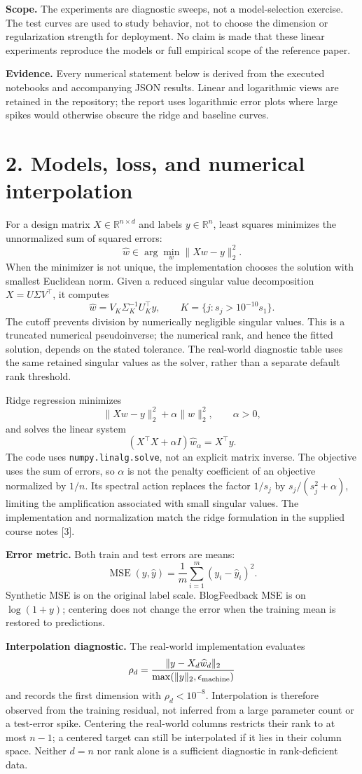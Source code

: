 \documentclass[10pt,a4paper]{article}
\newcommand{\pageheading}[1]{\section*{#1}}
\begin{document}
\textbf{Scope.} The experiments are diagnostic sweeps, not a model-selection exercise. The test curves are used to study behavior, not to choose the dimension or regularization strength for deployment. No claim is made that these linear experiments reproduce the models or full empirical scope of the reference paper.

\textbf{Evidence.} Every numerical statement below is derived from the executed notebooks and accompanying JSON results. Linear and logarithmic views are retained in the repository; the report uses logarithmic error plots where large spikes would otherwise obscure the ridge and baseline curves.

\newpage
\pageheading{2. Models, loss, and numerical interpolation}
For a design matrix $X\in\mathbb{R}^{n\times d}$ and labels $y\in\mathbb{R}^n$, least squares minimizes the unnormalized sum of squared errors:
\[
\widehat w\in\arg\min_w\|Xw-y\|_2^2.
\]
When the minimizer is not unique, the implementation chooses the solution with smallest Euclidean norm. Given a reduced singular value decomposition $X=U\Sigma V^\top$, it computes
\[
\widehat w=V_K\Sigma_K^{-1}U_K^\top y,
\qquad K=\{j:s_j>10^{-10}s_1\}.
\]
The cutoff prevents division by numerically negligible singular values. This is a truncated numerical pseudoinverse; the numerical rank, and hence the fitted solution, depends on the stated tolerance. The real-world diagnostic table uses the same retained singular values as the solver, rather than a separate default rank threshold.

Ridge regression minimizes
\[
\|Xw-y\|_2^2+\alpha\|w\|_2^2,\qquad\alpha>0,
\]
and solves the linear system
\[
(X^\top X+\alpha I)\widehat w_\alpha=X^\top y.
\]
The code uses \texttt{numpy.linalg.solve}, not an explicit matrix inverse. The objective uses the sum of errors, so $\alpha$ is not the penalty coefficient of an objective normalized by $1/n$. Its spectral action replaces the factor $1/s_j$ by $s_j/(s_j^2+\alpha)$, limiting the amplification associated with small singular values. The implementation and normalization match the ridge formulation in the supplied course notes [3].

\textbf{Error metric.} Both train and test errors are means:
\[
\operatorname{MSE}(y,\widehat y)=\frac{1}{m}\sum_{i=1}^m(y_i-\widehat y_i)^2.
\]
Synthetic MSE is on the original label scale. BlogFeedback MSE is on $\log(1+y)$; centering does not change the error when the training mean is restored to predictions.

\textbf{Interpolation diagnostic.} The real-world implementation evaluates
\[
\rho_d=\frac{\|y-X_d\widehat w_d\|_2}
{\max(\|y\|_2,\epsilon_{\rm machine})}
\]
and records the first dimension with $\rho_d<10^{-8}$. Interpolation is therefore observed from the training residual, not inferred from a large parameter count or a test-error spike. Centering the real-world columns restricts their rank to at most $n-1$; a centered target can still be interpolated if it lies in their column space. Neither $d=n$ nor rank alone is a sufficient diagnostic in rank-deficient data.
\end{document}
